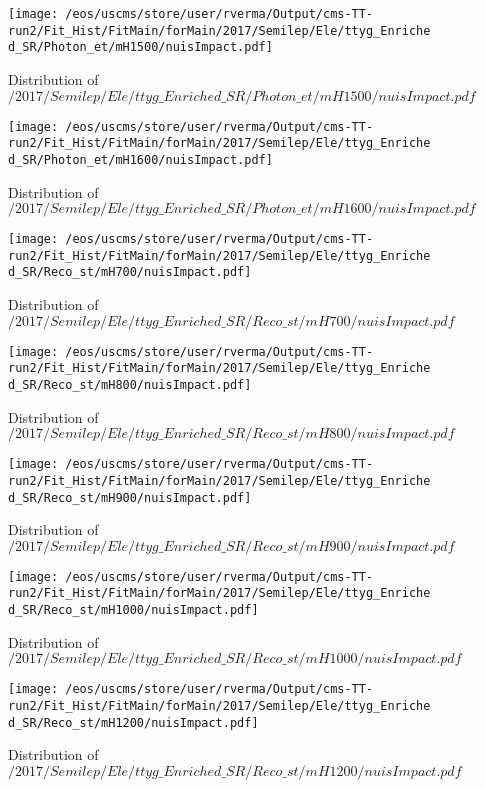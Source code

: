 \begin{figure}
\centering
\texttt{[image: /eos/uscms/store/user/rverma/Output/cms-TT-run2/Fit\_Hist/FitMain/forMain/2017/Semilep/Ele/ttyg\_Enriched\_SR/Photon\_et/mH1500/nuisImpact.pdf]}
\caption{Distribution of $/2017/Semilep/Ele/ttyg\_Enriched\_SR/Photon\_et/mH1500/nuisImpact.pdf$}
\end{figure}

\begin{figure}
\centering
\texttt{[image: /eos/uscms/store/user/rverma/Output/cms-TT-run2/Fit\_Hist/FitMain/forMain/2017/Semilep/Ele/ttyg\_Enriched\_SR/Photon\_et/mH1600/nuisImpact.pdf]}
\caption{Distribution of $/2017/Semilep/Ele/ttyg\_Enriched\_SR/Photon\_et/mH1600/nuisImpact.pdf$}
\end{figure}

\begin{figure}
\centering
\texttt{[image: /eos/uscms/store/user/rverma/Output/cms-TT-run2/Fit\_Hist/FitMain/forMain/2017/Semilep/Ele/ttyg\_Enriched\_SR/Reco\_st/mH700/nuisImpact.pdf]}
\caption{Distribution of $/2017/Semilep/Ele/ttyg\_Enriched\_SR/Reco\_st/mH700/nuisImpact.pdf$}
\end{figure}

\begin{figure}
\centering
\texttt{[image: /eos/uscms/store/user/rverma/Output/cms-TT-run2/Fit\_Hist/FitMain/forMain/2017/Semilep/Ele/ttyg\_Enriched\_SR/Reco\_st/mH800/nuisImpact.pdf]}
\caption{Distribution of $/2017/Semilep/Ele/ttyg\_Enriched\_SR/Reco\_st/mH800/nuisImpact.pdf$}
\end{figure}

\begin{figure}
\centering
\texttt{[image: /eos/uscms/store/user/rverma/Output/cms-TT-run2/Fit\_Hist/FitMain/forMain/2017/Semilep/Ele/ttyg\_Enriched\_SR/Reco\_st/mH900/nuisImpact.pdf]}
\caption{Distribution of $/2017/Semilep/Ele/ttyg\_Enriched\_SR/Reco\_st/mH900/nuisImpact.pdf$}
\end{figure}

\begin{figure}
\centering
\texttt{[image: /eos/uscms/store/user/rverma/Output/cms-TT-run2/Fit\_Hist/FitMain/forMain/2017/Semilep/Ele/ttyg\_Enriched\_SR/Reco\_st/mH1000/nuisImpact.pdf]}
\caption{Distribution of $/2017/Semilep/Ele/ttyg\_Enriched\_SR/Reco\_st/mH1000/nuisImpact.pdf$}
\end{figure}

\begin{figure}
\centering
\texttt{[image: /eos/uscms/store/user/rverma/Output/cms-TT-run2/Fit\_Hist/FitMain/forMain/2017/Semilep/Ele/ttyg\_Enriched\_SR/Reco\_st/mH1200/nuisImpact.pdf]}
\caption{Distribution of $/2017/Semilep/Ele/ttyg\_Enriched\_SR/Reco\_st/mH1200/nuisImpact.pdf$}
\end{figure}

